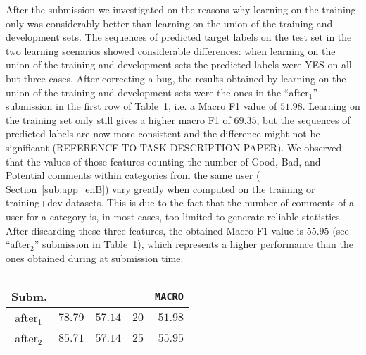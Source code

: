 After the submission we investigated on the reasons why learning on the training 
only was considerably better than learning on the union of the training and 
development sets. 
The sequences of predicted target labels on the test set in the two learning 
scenarios showed considerable differences: when learning on the union of the 
training and development sets the predicted labels were YES on all but three 
cases. 
After correcting a bug, the results obtained by learning on the union of the 
training and development sets were the ones in the ``after$_1$'' submission in 
the first row of Table~\ref{tab:aftertaskb}, i.e.  
a Macro F1 value of $51.98$. Learning on the training set only still gives a 
higher macro F1 of $69.35$, but the sequences of predicted labels are now more 
consistent and the difference might not be significant (REFERENCE TO TASK 
DESCRIPTION PAPER). 
We observed that the values of those features counting the number of Good, Bad, 
and Potential comments within categories from the same user (\cf 
Section~\ref{sub:app_enB}) vary greatly when computed on the training or 
training+dev datasets. 
This is due to the fact that the number of comments of a user for a category is, 
in most cases, too limited to generate reliable statistics. 
After discarding these three features, the obtained Macro F1 value is $55.95$ 
(see ``after$_2$'' submission in Table~\ref{tab:aftertaskb}), which represents a 
higher performance than the ones obtained during at submission time.

\begin{table}%
\begin{tabular}{|l|crrr|}
\hline  
 Subm.		& \bf \yes & \bf \no & \bf \unsure & \bf \texttt{MACRO}	 \\
  \hline
  \,\,after$_1$	& $78.79$	& $57.14$	& $20$	& $51.98$ \\
  \,\,after$_2$ & $85.71$	& $57.14$	& $25$ 	& $55.95$ \\
  \hline
 \end{tabular}
 \caption{\label{tab:aftertaskb}}
 \end{table}